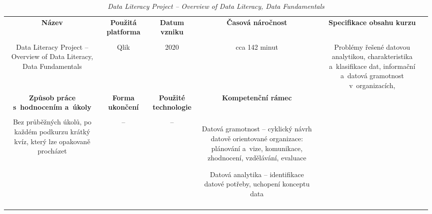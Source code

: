 \begin{landscape}

\begin{table}[htbp]

\renewcommand\thetable{3}

\caption{\textit{Data Literacy Project – Overview of Data Literacy, Data Fundamentals}}\label{tab3}

\footnotesize

{

\justifying

\begin{tabularx}{\linewidth}{CCCCC}

\toprule

\textbf{Název} &

\textbf{Použitá platforma} &

\textbf{Datum vzniku} &

\textbf{Časová náročnost} &
 
\textbf{Specifikace obsahu kurzu}

\\

\tabularnewline
\midrule

Data Literacy Project – Overview of Data Literacy, Data Fundamentals

&

Qlik

&

2020

&

cca 142 minut

&

Problémy řešené datovou analytikou, charakteristika a~klasifikace dat, informační a~datová gramotnost v~organizacích, 

\\
\toprule

\textbf{Způsob práce s~hodnocením a~úkoly} &

\textbf{Forma ukončení} &

\textbf{Použité technologie} &

\textbf{Kompetenční rámec} 

\\

\tabularnewline
\midrule

Bez průběžných úkolů, po každém podkurzu krátký kvíz, který lze opakovaně procházet

&

–

&

–

&

Datová gramotnost – cyklický návrh datově orientované organizace: plánování a~vize, komunikace, zhodnocení, vzdělávání, evaluace

Datová analytika – identifikace datové potřeby, uchopení konceptu data

\\

\tabularnewline
\bottomrule
\end{tabularx}

}

\end{table}

\end{landscape}